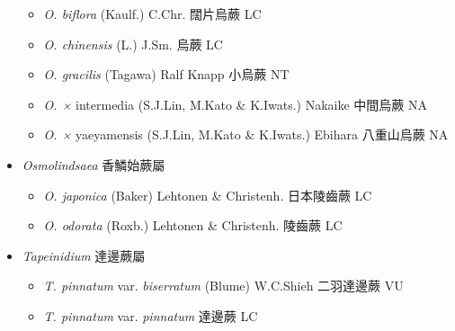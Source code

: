 \begin{itemize}
  \begin{itemize}
        \item[] \textit{O. biflora} (Kaulf.) C.Chr.  闊片烏蕨   LC
        \item[] \textit{O. chinensis} (L.) J.Sm.  烏蕨   LC
        \item[] \textit{O. gracilis} (Tagawa) Ralf Knapp  小烏蕨   NT
        \item[] \textit{O. ×} intermedia \textit{} (S.J.Lin, M.Kato \& K.Iwats.) Nakaike 
                                        中間烏蕨   NA
        \item[] \textit{O. ×} yaeyamensis \textit{} (S.J.Lin, M.Kato \& K.Iwats.) Ebihara 
                                        八重山烏蕨   NA
  \end{itemize}
 \item[] \textit{Osmolindsaea} 香鱗始蕨屬
                                
  \begin{itemize}
        \item[] \textit{O. japonica} (Baker) Lehtonen \& Christenh.  日本陵齒蕨   LC
        \item[] \textit{O. odorata} (Roxb.) Lehtonen \& Christenh.  陵齒蕨   LC
  \end{itemize}
 \item[] \textit{Tapeinidium} 達邊蕨屬
                                
  \begin{itemize}
        \item[] \textit{T. pinnatum} var. \textit{biserratum} (Blume) W.C.Shieh 
                                        二羽達邊蕨   VU
        \item[] \textit{T. pinnatum} var. \textit{pinnatum}  
                                        達邊蕨   LC
  \end{itemize}
  \end{itemize}
